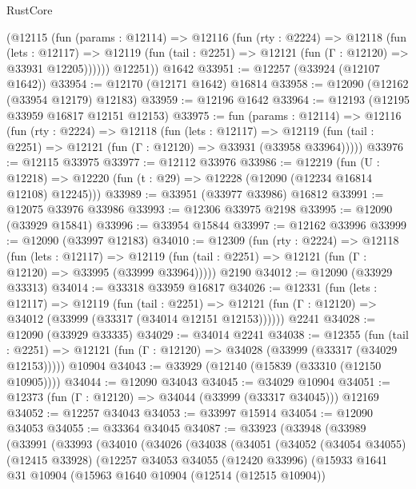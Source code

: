 \begin{lexlean}{RustCore}
\begin{coremodule}
        (@12115
          (fun (params : @12114) =>
          @12116
            (fun (rty : @2224) =>
            @12118
              (fun (lets : @12117) =>
              @12119 (fun (tail : @2251) => @12121 (fun (Γ : @12120) => @33931 @12205))))))
        @12251))
    @1642
@33951 := @12257 (@33924 (@12107 @1642))
@33954 := @12170 (@12171 @1642) @16814
@33958 := @12090 (@12162 (@33954 @12179) @12183)
@33959 := @12196 @1642
@33964 := @12193 (@12195 @33959 @16817 @12151 @12153)
@33975 := fun (params : @12114) =>
  @12116
    (fun (rty : @2224) =>
    @12118
      (fun (lets : @12117) =>
      @12119 (fun (tail : @2251) => @12121 (fun (Γ : @12120) => @33931 (@33958 @33964)))))
@33976 := @12115 @33975
@33977 := @12112 @33976
@33986 := @12219
    (fun (U : @12218) => @12220 (fun (t : @29) => @12228 (@12090 (@12234 @16814 @12108) @12245)))
@33989 := @33951 (@33977 @33986) @16812
@33991 := @12075 @33976 @33986
@33993 := @12306 @33975 @2198
@33995 := @12090 (@33929 @15841)
@33996 := @33954 @15844
@33997 := @12162 @33996
@33999 := @12090 (@33997 @12183)
@34010 := @12309
    (fun (rty : @2224) =>
    @12118
      (fun (lets : @12117) =>
      @12119 (fun (tail : @2251) => @12121 (fun (Γ : @12120) => @33995 (@33999 @33964)))))
    @2190
@34012 := @12090 (@33929 @33313)
@34014 := @33318 @33959 @16817
@34026 := @12331
    (fun (lets : @12117) =>
    @12119
      (fun (tail : @2251) =>
      @12121 (fun (Γ : @12120) => @34012 (@33999 (@33317 (@34014 @12151 @12153))))))
    @2241
@34028 := @12090 (@33929 @33335)
@34029 := @34014 @2241
@34038 := @12355
    (fun (tail : @2251) => @12121 (fun (Γ : @12120) => @34028 (@33999 (@33317 (@34029 @12153)))))
    @10904
@34043 := @33929 (@12140 (@15839 (@33310 (@12150 @10905))))
@34044 := @12090 @34043
@34045 := @34029 @10904
@34051 := @12373 (fun (Γ : @12120) => @34044 (@33999 (@33317 @34045))) @12169
@34052 := @12257 @34043
@34053 := @33997 @15914
@34054 := @12090 @34053
@34055 := @33364 @34045
@34087 := @33923
    (@33948
      (@33989
        (@33991
          (@33993
            (@34010
              (@34026
                (@34038
                  (@34051
                    (@34052
                      (@34054 @34055)
                      (@12415 @33928)
                      (@12257
                        @34053
                        @34055
                        (@12420 @33996)
                        (@15933
                          @1641
                          @31
                          @10904
                          (@15963
                            @1640
                            @10904
                            (@12514 (@12515 @10904))

\end{coremodule}
\end{lexlean}
